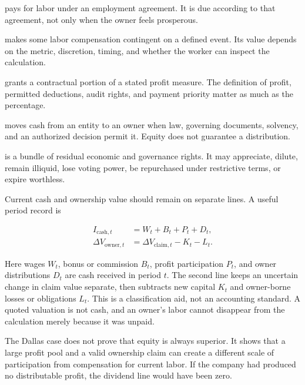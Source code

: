 \begin{description}[leftmargin=2.7em,style=nextline]
\item[Salary or wage] pays for labor under an employment agreement. It is due
  according to that agreement, not only when the owner feels prosperous.
\item[Bonus or commission] makes some labor compensation contingent on a
  defined event. Its value depends on the metric, discretion, timing, and
  whether the worker can inspect the calculation.
\item[Profit share] grants a contractual portion of a stated profit measure.
  The definition of profit, permitted deductions, audit rights, and payment
  priority matter as much as the percentage.
\item[Distribution or dividend] moves cash from an entity to an owner when law,
  governing documents, solvency, and an authorized decision permit it. Equity
  does not guarantee a distribution.
\item[Equity] is a bundle of residual economic and governance rights. It may
  appreciate, dilute, remain illiquid, lose voting power, be repurchased under
  restrictive terms, or expire worthless.
\end{description}

Current cash and ownership value should remain on separate lines. A useful
period record is

\begin{align}
I_{\mathrm{cash},t}
  &= W_t+B_t+P_t+D_t,\\
\Delta V_{\mathrm{owner},t}
  &= \Delta V_{\mathrm{claim},t}-K_t-L_t.
\end{align}

Here wages \(W_t\), bonus or commission \(B_t\), profit participation \(P_t\),
and owner distributions \(D_t\) are cash received in period \(t\). The second
line keeps an uncertain change in claim value separate, then subtracts new
capital \(K_t\) and owner-borne losses or obligations \(L_t\). This is a
classification aid, not an accounting standard. A quoted valuation is not
cash, and an owner's labor cannot disappear from the calculation merely
because it was unpaid.

The Dallas case does not prove that equity is always superior. It shows that a
large profit pool and a valid ownership claim can create a different scale of
participation from compensation for current labor. If the company had produced
no distributable profit, the dividend line would have been zero.

